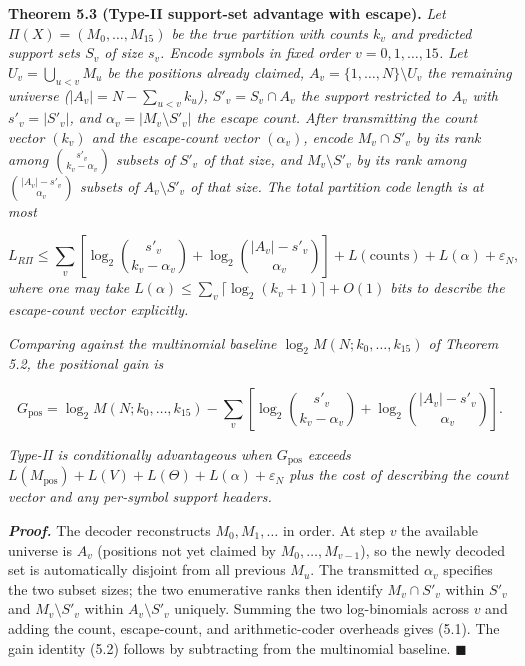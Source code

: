 \documentclass[
]{article}
\begin{document}
\textbf{Theorem 5.3 (Type-II support-set advantage with escape).}
\emph{Let $\Pi(X) = (M_0, \ldots, M_{15})$ be the true partition with
counts $k_v$ and predicted support sets $S_v$ of size $s_v$.
Encode symbols in fixed order $v = 0, 1, \ldots, 15$. Let
$U_v = \bigcup_{u < v} M_u$ be the positions already claimed,
$A_v = \{1, \ldots, N\} \setminus U_v$ the remaining universe
($|A_v| = N - \sum_{u<v} k_u$), $S'_v = S_v \cap A_v$ the support
restricted to $A_v$ with $s'_v = |S'_v|$, and
$\alpha_v = |M_v \setminus S'_v|$ the escape count.
After transmitting the count vector $(k_v)$ and the escape-count
vector $(\alpha_v)$, encode $M_v \cap S'_v$ by its rank among
$\binom{s'_v}{k_v - \alpha_v}$ subsets of $S'_v$ of that size, and
$M_v \setminus S'_v$ by its rank among
$\binom{|A_v| - s'_v}{\alpha_v}$ subsets of $A_v \setminus S'_v$ of
that size. The total partition code length is at most}

\[
L_{R\Pi} \leq \sum_v \left[\log_2 \binom{s'_v}{k_v - \alpha_v} + \log_2 \binom{|A_v| - s'_v}{\alpha_v}\right] + L(\text{counts}) + L(\alpha) + \varepsilon_N,
\tag{5.1}
\]
\emph{where one may take
$L(\alpha) \leq \sum_v \lceil \log_2 (k_v + 1) \rceil + O(1)$ bits to
describe the escape-count vector explicitly.}

\emph{Comparing against the multinomial baseline
$\log_2 M(N; k_0, \ldots, k_{15})$ of Theorem 5.2, the positional
gain is}

\[
G_{\text{pos}} = \log_2 M(N; k_0, \ldots, k_{15}) - \sum_v \left[\log_2 \binom{s'_v}{k_v - \alpha_v} + \log_2 \binom{|A_v| - s'_v}{\alpha_v}\right].
\tag{5.2}
\]

\emph{Type-II is conditionally advantageous when $G_{\text{pos}}$
exceeds $L(M_{\text{pos}}) + L(V) + L(\Theta) + L(\alpha) +
\varepsilon_N$ plus the cost of describing the count vector and any
per-symbol support headers.}

\emph{\textbf{Proof.}} The decoder reconstructs $M_0, M_1, \ldots$ in
order. At step $v$ the available universe is $A_v$ (positions not
yet claimed by $M_0, \ldots, M_{v-1}$), so the newly decoded set is
automatically disjoint from all previous $M_u$. The transmitted
$\alpha_v$ specifies the two subset sizes; the two enumerative ranks
then identify $M_v \cap S'_v$ within $S'_v$ and $M_v \setminus S'_v$
within $A_v \setminus S'_v$ uniquely. Summing the two log-binomials
across $v$ and adding the count, escape-count, and arithmetic-coder
overheads gives (5.1). The gain identity (5.2) follows by subtracting
from the multinomial baseline. \hfill$\blacksquare$
\end{document}
